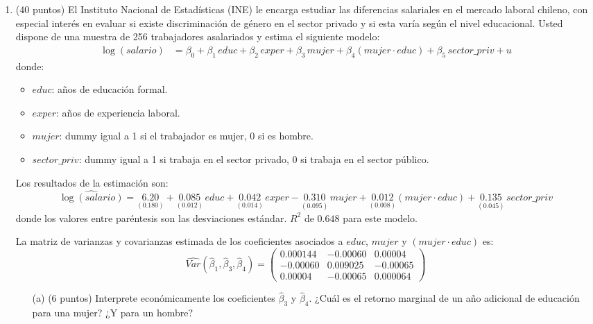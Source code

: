 \documentclass[10pt,a4paper]{article}
\begin{document}
\begin{enumerate}

     \color{black}  
    \item (40 puntos) El Instituto Nacional de Estadísticas (INE) le encarga estudiar las diferencias salariales en el mercado laboral chileno, con especial interés en evaluar si existe discriminación de género en el sector privado y si esta varía según el nivel educacional. Usted dispone de una muestra de 256 trabajadores asalariados y estima el siguiente modelo:
\begin{align*}
\log(salario) &= \beta_0 + \beta_1 \, educ + \beta_2 \, exper + \beta_3 \, mujer + \beta_4 (mujer \cdot educ) + \beta_5 \, sector\_priv + u
\end{align*}
donde:
\begin{itemize}
    \item $educ$: años de educación formal.
    \item $exper$: años de experiencia laboral.
    \item $mujer$: dummy igual a 1 si el trabajador es mujer, 0 si es hombre.
    \item $sector\_priv$: dummy igual a 1 si trabaja en el sector privado, 0 si trabaja en el sector público.
\end{itemize}

Los resultados de la estimación son:
\[
\widehat{\log(salario)} = \underset{(0.180)}{6.20} + \underset{(0.012)}{0.085} \, educ + \underset{(0.014)}{0.042} \, exper - \underset{(0.095)}{0.310} \, mujer + \underset{(0.008)}{0.012} (mujer \cdot educ) + \underset{(0.045)}{0.135} \, sector\_priv
\]
donde los valores entre paréntesis son las desviaciones estándar. $R^2$ de $0.648$ para este modelo.

La matriz de varianzas y covarianzas estimada de los coeficientes asociados a $educ$, $mujer$ y $(mujer \cdot educ)$ es:
\[
\widehat{Var}(\hat{\beta}_1, \hat{\beta}_3, \hat{\beta}_4) = 
\begin{pmatrix}
0.000144 & -0.00060 & 0.00004 \\
-0.00060 & 0.009025 & -0.00065 \\
0.00004 & -0.00065 & 0.000064
\end{pmatrix}
\]

\begin{enumerate}
    \item[(a)] (6 puntos) Interprete económicamente los coeficientes $\hat{\beta}_3$ y $\hat{\beta}_4$. ¿Cuál es el retorno marginal de un año adicional de educación para una mujer? ¿Y para un hombre?
    

\end{enumerate}
\end{enumerate}
\end{document}
